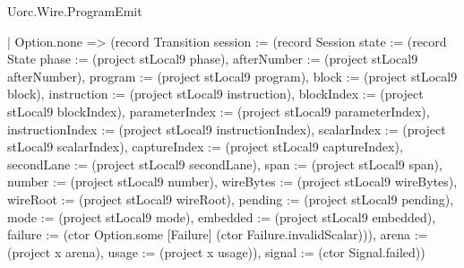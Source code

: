 \begin{lexlean}{Uorc.Wire.ProgramEmit}
\begin{semanticmodule}
{            | Option.none => (record Transition {session := (record Session {state := (record State {phase := (project stLocal9 phase), afterNumber := (project stLocal9 afterNumber), program := (project stLocal9 program), block := (project stLocal9 block), instruction := (project stLocal9 instruction), blockIndex := (project stLocal9 blockIndex), parameterIndex := (project stLocal9 parameterIndex), instructionIndex := (project stLocal9 instructionIndex), scalarIndex := (project stLocal9 scalarIndex), captureIndex := (project stLocal9 captureIndex), secondLane := (project stLocal9 secondLane), span := (project stLocal9 span), number := (project stLocal9 number), wireBytes := (project stLocal9 wireBytes), wireRoot := (project stLocal9 wireRoot), pending := (project stLocal9 pending), mode := (project stLocal9 mode), embedded := (project stLocal9 embedded), failure := (ctor Option.some [Failure] (ctor Failure.invalidScalar))}), arena := (project x arena), usage := (project x usage)}), signal := (ctor Signal.failed)})
}
\end{semanticmodule}
\end{lexlean}
